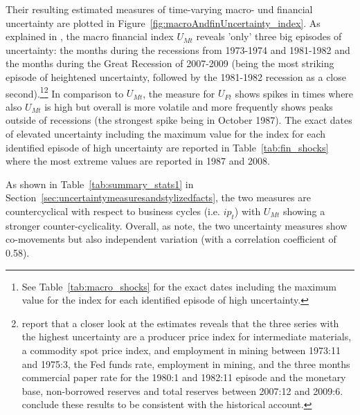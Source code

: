 \documentclass[a4paper,11pt,listof=nochaptergap,oneside,pointednumbers,bibtotoc,bigheadings,liststotoc,hidelinks]{scrbook}
\theoremstyle{mysatz}
\theoremstyle{mydefinition}
\theoremstyle{mytheorem}
\theoremstyle{mybemerkung}
\begin{document}
Their resulting estimated measures of time-varying macro- und financial uncertainty are plotted in Figure~\ref{fig:macroAndfinUncertainty_index}. As explained in \citet{ludvigsonetal:19}, the macro financial index $U_{Mt}$ reveals 'only' three big episodes of uncertainty: the months during the recessions from 1973-1974 and 1981-1982 and the months during the Great Recession of 2007-2009 (being the most striking episode of heightened uncertainty, followed by the 1981-1982 recession as a close second).\footnote{See Table~\ref{tab:macro_shocks} for the exact dates including the maximum value for the index for each identified episode of high uncertainty.}\footnote{\citet{juradoetal:15} report that a closer look at the estimates reveals that the three series with the highest uncertainty are a producer price index for intermediate materials, a commodity spot price index, and employment in mining between 1973:11 and 1975:3, the Fed funds rate, employment in mining, and the three months commercial paper rate for the 1980:1 and 1982:11 episode and the monetary base, non-borrowed reserves and total reserves between 2007:12 and 2009:6. \citet{juradoetal:15} conclude these results to be consistent with the historical account.} In comparison to $U_{Mt}$, the measure for $U_{Ft}$ shows spikes in times where also $U_{Mt}$ is high but overall is more volatile and more frequently shows peaks outside of recessions (the strongest spike being in October 1987). The exact dates of elevated uncertainty including the maximum value for the index for each identified episode of high uncertainty are reported in Table~\ref{tab:fin_shocks} where the most extreme values are reported in 1987 and 2008.

As shown in Table~\ref{tab:summary_stats1} in Section~\ref{sec:uncertaintymeasuresandstylizedfacts}, the two measures are countercyclical with respect to business cycles (i.e. $ip_t$) with $U_{Mt}$ showing a stronger counter-cyclicality. Overall, as \citet{ludvigsonetal:19} note, the two uncertainty measures show co-movements but also independent variation (with a correlation coefficient of 0.58). 
\end{document}
